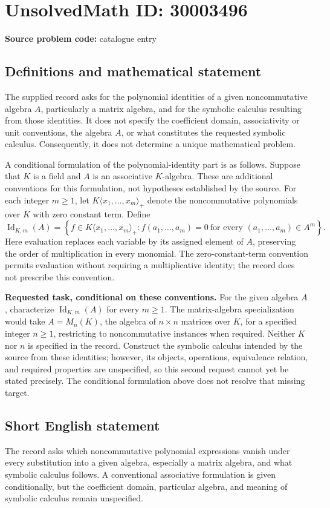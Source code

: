 \documentclass[11pt]{article}
\begin{document}
\section*{UnsolvedMath ID: 30003496}
\textbf{Source problem code:} catalogue entry
\subsection{Definitions and mathematical statement}
The supplied record asks for the polynomial identities of a given noncommutative algebra \(A\), particularly a matrix algebra, and for the symbolic calculus resulting from those identities. It does not specify the coefficient domain, associativity or unit conventions, the algebra \(A\), or what constitutes the requested symbolic calculus. Consequently, it does not determine a unique mathematical problem.

A conditional formulation of the polynomial-identity part is as follows. Suppose that \(K\) is a field and \(A\) is an associative \(K\)-algebra. These are additional conventions for this formulation, not hypotheses established by the source. For each integer \(m\geq 1\), let \(K\langle x_1,\ldots,x_m\rangle_+\) denote the noncommutative polynomials over \(K\) with zero constant term. Define
\[
\operatorname{Id}_{K,m}(A)=\left\{f\in K\langle x_1,\ldots,x_m\rangle_+ : f(a_1,\ldots,a_m)=0\ \text{for every }(a_1,\ldots,a_m)\in A^m\right\}.
\]
Here evaluation replaces each variable by its assigned element of \(A\), preserving the order of multiplication in every monomial. The zero-constant-term convention permits evaluation without requiring a multiplicative identity; the record does not prescribe this convention.

\textbf{Requested task, conditional on these conventions.} For the given algebra \(A\), characterize \(\operatorname{Id}_{K,m}(A)\) for every \(m\geq 1\). The matrix-algebra specialization would take \(A=M_n(K)\), the algebra of \(n\times n\) matrices over \(K\), for a specified integer \(n\geq 1\), restricting to noncommutative instances when required. Neither \(K\) nor \(n\) is specified in the record. Construct the symbolic calculus intended by the source from these identities; however, its objects, operations, equivalence relation, and required properties are unspecified, so this second request cannot yet be stated precisely. The conditional formulation above does not resolve that missing target.
\subsection{Short English statement}
The record asks which noncommutative polynomial expressions vanish under every substitution into a given algebra, especially a matrix algebra, and what symbolic calculus follows. A conventional associative formulation is given conditionally, but the coefficient domain, particular algebra, and meaning of symbolic calculus remain unspecified.
\end{document}
